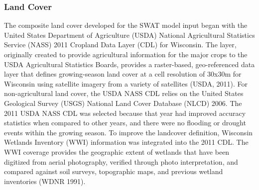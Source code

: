 \subsubsection{Land Cover}
The composite land cover developed for the SWAT model input began with the United States Department of Agriculture (USDA) National Agricultural Statistics Service (NASS) 2011 Cropland Data Layer (CDL) for Wisconsin. The layer, originally created to provide agricultural information for the major crops to the USDA Agricultural Statistics Boards, provides a raster-based, geo-referenced data layer that defines growing-season land cover at a cell resolution of 30x30m for Wisconsin using satellite imagery from a variety of satellites (USDA, 2011). For non-agricultural land cover, the USDA NASS CDL relies on the United States Geological Survey (USGS) National Land Cover Database (NLCD) 2006. The 2011 USDA NASS CDL was selected because that year had improved accuracy statistics when compared to other years, and there were no flooding or drought events within the growing season. To improve the landcover definition, Wisconsin Wetlands Inventory (WWI) information was integrated into the 2011 CDL. The WWI coverage provides the geographic extent of wetlands that have been digitized from aerial photography, verified through photo interpretation, and compared against soil surveys, topographic maps, and previous wetland inventories (WDNR 1991).